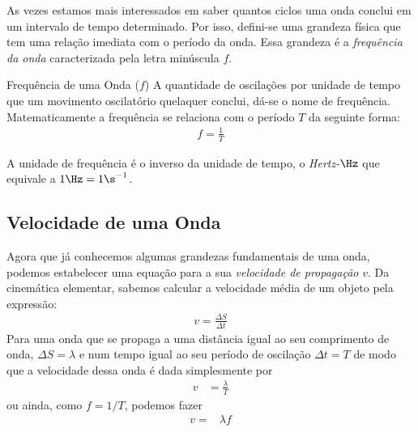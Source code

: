 As vezes estamos mais interessados em saber quantos ciclos uma onda conclui em um intervalo de tempo determinado. Por isso, defini-se uma grandeza física que tem uma relação imediata com o período da onda. Essa grandeza é a \emph{frequência da onda} caracterizada pela letra minúscula $f$.

\begin{mybox}[colback=white, colframe=deepred,colbacktitle=deepred!85!deepred,]{Frequência de uma Onda ($f$)}
    A quantidade de oscilações por unidade de tempo que um movimento oscilatório quelaquer conclui, dá-se o nome de frequência.
    \tcblower
    Matematicamente a frequência se relaciona com o período $T$ da seguinte forma:
    \begin{align}
        \label{eq:freq-periodo}
        f=\frac{1}{T}
    \end{align}
  \end{mybox}
A unidade de frequência é o inverso da unidade de tempo, o \emph{Hertz-$\Hz$} que equivale a $1\Hz=1\s^{-1}$.


\subsection*{Velocidade de uma Onda}
\label{sec:velocidade-da-onda}
Agora que já conhecemos algumas grandezas fundamentais de uma onda, podemos estabelecer uma equação para a sua \emph{velocidade de propagação} $v$. Da cinemática elementar, sabemos calcular a velocidade média de um objeto pela expressão:
\begin{align}
    v=\frac{\Delta S}{\Delta t}
\end{align}
Para uma onda que se propaga a uma distância igual ao seu comprimento de onda, $\Delta S=\lambda$ e num tempo igual ao seu período de oscilação $\Delta t=T$ de modo que a velocidade dessa onda é dada simplesmente por
\begin{align}
    \label{eq:velocidade-onda-T}
    v&=\frac{\lambda}{T}
\end{align}
ou ainda, como $f=1/T$, podemos fazer
\begin{align}
    v=&\lambda f
\end{align}


